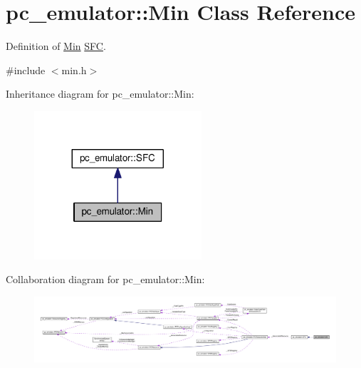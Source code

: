 \hypertarget{classpc__emulator_1_1Min}{}\section{pc\+\_\+emulator\+:\+:Min Class Reference}
\label{classpc__emulator_1_1Min}


Definition of \hyperlink{classpc__emulator_1_1Min}{Min} \hyperlink{classpc__emulator_1_1SFC}{S\+FC}.  




{\ttfamily \#include $<$min.\+h$>$}



Inheritance diagram for pc\+\_\+emulator\+:\+:Min\+:\nopagebreak
\begin{figure}[H]
\begin{center}
\leavevmode
\includegraphics[width=176pt]{classpc__emulator_1_1Min__inherit__graph}
\end{center}
\end{figure}


Collaboration diagram for pc\+\_\+emulator\+:\+:Min\+:\nopagebreak
\begin{figure}[H]
\begin{center}
\leavevmode
\includegraphics[width=350pt]{classpc__emulator_1_1Min__coll__graph}
\end{center}
\end{figure}
